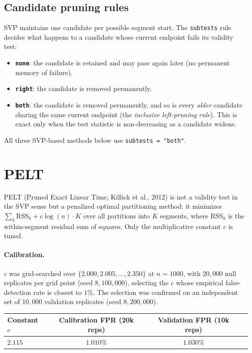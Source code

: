 \documentclass[11pt]{article}
\begin{document}
\subsection*{Candidate pruning rules}

SVP maintains one candidate per possible segment start. The
\texttt{subtests} rule decides what happens to a candidate whose current
endpoint fails its validity test:
\begin{itemize}
\item \textbf{\texttt{none}}: the candidate is retained and may pass again
  later (no permanent memory of failure).
\item \textbf{\texttt{right}}: the candidate is removed permanently.
\item \textbf{\texttt{both}}: the candidate is removed permanently, and so
  is every \emph{older} candidate sharing the same current endpoint (the
  \emph{inclusive left-pruning rule}). This is exact only when the test
  statistic is non-decreasing as a candidate widens.
\end{itemize}
All three SVP-based methods below use \texttt{subtests = "both"}.

\section{PELT}

PELT (Pruned Exact Linear Time; Killick et al., 2012) is not a validity
test in the SVP sense but a penalized optimal partitioning method: it
minimizes $\sum_k \mathrm{RSS}_k + c\log(n)\cdot K$ over all partitions into
$K$ segments, where $\mathrm{RSS}_k$ is the within-segment residual sum of
squares. Only the multiplicative constant $c$ is tuned.

\paragraph{Calibration.} $c$ was grid-searched over $\{2.000, 2.005,
\dots, 2.350\}$ at $n=1000$, with $20{,}000$ null replicates per grid point
(seed $8{,}100{,}000$), selecting the $c$ whose empirical false-detection
rate is closest to $1\%$. The selection was confirmed on an independent set
of $10{,}000$ validation replicates (seed $8{,}200{,}000$).

\begin{center}
\begin{tabular}{lccc}
\toprule
Constant $c$ & Calibration FPR (20k reps) & Validation FPR (10k reps) \\
\midrule
$2.115$ & $1.010\%$ & $1.030\%$ \\
\bottomrule
\end{tabular}
\end{center}
\end{document}
